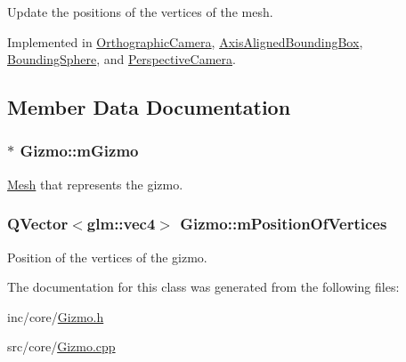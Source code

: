 Update the positions of the vertices of the mesh. 



Implemented in \hyperlink{class_orthographic_camera_ad774f1e383f99a94e3f733ecaa814e80}{Orthographic\+Camera}, \hyperlink{class_axis_aligned_bounding_box_a9682fe904e3c0c1369b4e94002c9b025}{Axis\+Aligned\+Bounding\+Box}, \hyperlink{class_bounding_sphere_ab1d394277a8f79bc970765af75273319}{Bounding\+Sphere}, and \hyperlink{class_perspective_camera_a80ca50f210c1ea07f346bcee9dff6451}{Perspective\+Camera}.



\subsection{Member Data Documentation}
\hypertarget{class_gizmo_af458aa807ec26bd57dc3a58024dc5e5e}{
\subsubsection[{m\+Gizmo}]{$\ast$ Gizmo\+::m\+Gizmo\hspace{0.3cm}{\ttfamily [protected]}}}\label{class_gizmo_af458aa807ec26bd57dc3a58024dc5e5e}


\hyperlink{class_mesh}{Mesh} that represents the gizmo. 

\hypertarget{class_gizmo_ae6e4173865120b76bf530f5f0ee8ec43}{
\subsubsection[{m\+Position\+Of\+Vertices}]{\setlength{\rightskip}{0pt plus 5cm}Q\+Vector$<$glm\+::vec4$>$ Gizmo\+::m\+Position\+Of\+Vertices\hspace{0.3cm}{\ttfamily [protected]}}}\label{class_gizmo_ae6e4173865120b76bf530f5f0ee8ec43}


Position of the vertices of the gizmo. 



The documentation for this class was generated from the following files\+:\begin{DoxyCompactItemize}
\item 
inc/core/\hyperlink{_gizmo_8h}{Gizmo.\+h}\item 
src/core/\hyperlink{_gizmo_8cpp}{Gizmo.\+cpp}\end{DoxyCompactItemize}
